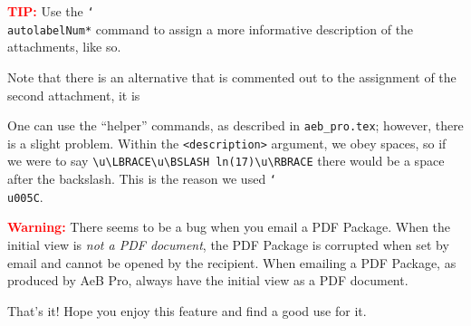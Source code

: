 \documentclass{article}
\newcommand{\cs}[1]{\texttt{\char`\\#1}}
\newcommand\newtopic{\par\ifdim\lastskip>0pt\relax\vskip-\lastskip\fi
\par\vskip6pt\noindent}
\def\aftersverbskip{\noindent}
\newenvironment{sverbatim}
{\par\small\verbatim}
{\endverbatim\par\aftergroup\aftersverbskip}
\begin{document}
\newtopic\textbf{\textcolor{red}{TIP:}} Use the \cs{autolabelNum*}
command to assign a more informative description of the attachments,
like so.
\begin{sverbatim}
\end{sverbatim}

Note that there is an alternative that is commented out to the assignment of the
second attachment, it is
\begin{sverbatim}
\end{sverbatim}
One can use the ``helper'' commands, as described in \texttt{aeb\_pro.tex}; however,
there is a slight problem.  Within the \texttt{<description>} argument, we obey spaces, so
if we were to say \verb!\u\LBRACE\u\BSLASH ln(17)\u\RBRACE! there would be a space
after the backslash. This is the reason we used \cs{u005C}.

\newtopic\textbf{\textcolor{red}{Warning:}} There seems to be a bug
when you email a PDF Package. When the initial view is \emph{not a PDF document}, the PDF Package
is corrupted when set by email and cannot be opened by the recipient.  When emailing a
PDF Package, as produced by AeB Pro, always have the initial view as a PDF document.

\newtopic That's it!  Hope you enjoy this feature and find a good
use for it.
\end{document}
